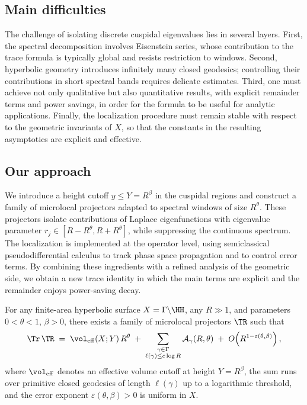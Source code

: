 \subsection{Main difficulties}
The challenge of isolating discrete cuspidal eigenvalues lies in several layers. 
First, the spectral decomposition involves Eisenstein series, whose contribution to the trace formula is typically global and resists restriction to windows. 
Second, hyperbolic geometry introduces infinitely many closed geodesics; controlling their contributions in short spectral bands requires delicate estimates. 
Third, one must achieve not only qualitative but also quantitative results, with explicit remainder terms and power savings, in order for the formula to be useful for analytic applications. 
Finally, the localization procedure must remain stable with respect to the geometric invariants of $X$, so that the constants in the resulting asymptotics are explicit and effective.

\subsection{Our approach}
We introduce a height cutoff $y\leq Y=R^\beta$ in the cuspidal regions and construct a family of microlocal projectors adapted to spectral windows of size $R^\theta$. 
These projectors isolate contributions of Laplace eigenfunctions with eigenvalue parameter $r_j\in[R-R^\theta,R+R^\theta]$, while suppressing the continuous spectrum. 
The localization is implemented at the operator level, using semiclassical pseudodifferential calculus to track phase space propagation and to control error terms. 
By combining these ingredients with a refined analysis of the geometric side, we obtain a new trace identity in which the main terms are explicit and the remainder enjoys power-saving decay.

\begin{theorem}\label{thm:main}
For any finite-area hyperbolic surface $X=\Gamma\backslash\HH$, any $R\gg 1$, and parameters $0<\theta<1$, $\beta>0$, there exists a family of microlocal projectors $\TR$ such that
\[
\Tr \,\TR \;=\; \vol_{\mathrm{eff}}(X;Y)\,R^\theta
\;+\; \sum_{\substack{\gamma\in\Gamma \\ \ell(\gamma)\leq c\log R}}
\mathcal{A}_\gamma(R,\theta)
\;+\; O\!\left(R^{1-\varepsilon(\theta,\beta)}\right),
\]
where $\vol_{\mathrm{eff}}$ denotes an effective volume cutoff at height $Y=R^\beta$, the sum runs over primitive closed geodesics of length $\ell(\gamma)$ up to a logarithmic threshold, and the error exponent $\varepsilon(\theta,\beta)>0$ is uniform in $X$.
\end{theorem}

